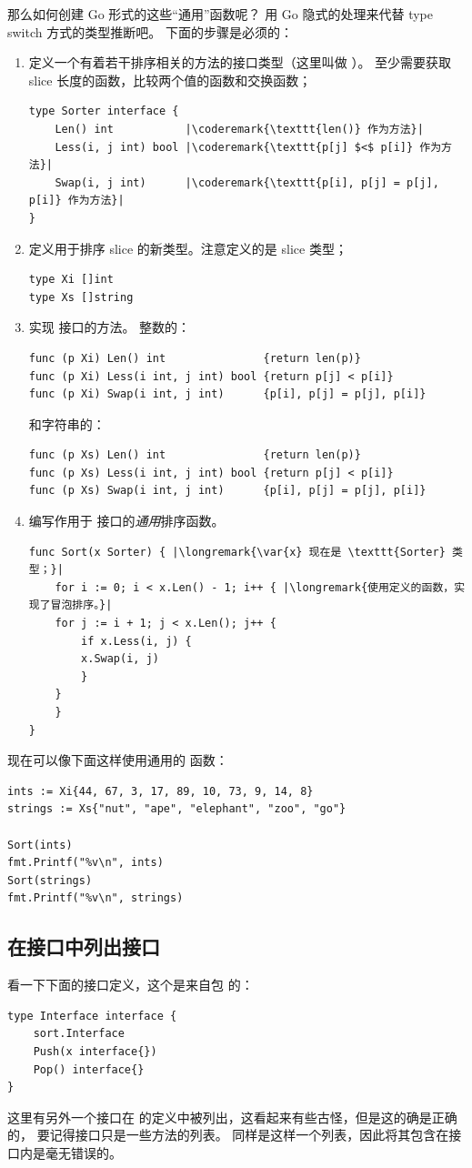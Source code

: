 那么如何创建 Go 形式的这些``通用''函数呢？
用 Go 隐式的处理来代替 type switch 方式的类型推断吧。
下面的步骤是必须的：
\begin{enumerate}
\item 定义一个有着若干排序相关的方法的接口类型（这里叫做 ）。
至少需要获取 slice 长度的函数，比较两个值的函数和交换函数；
\begin{lstlisting}
type Sorter interface {
    Len() int           |\coderemark{\texttt{len()} 作为方法}|
    Less(i, j int) bool |\coderemark{\texttt{p[j] $<$ p[i]} 作为方法}|
    Swap(i, j int)      |\coderemark{\texttt{p[i], p[j] = p[j], p[i]} 作为方法}|
}
\end{lstlisting}
\item 定义用于排序 slice 的新类型。注意定义的是 slice 类型；
\begin{lstlisting}
type Xi []int
type Xs []string
\end{lstlisting}
\item 实现  接口的方法。
整数的：
\begin{lstlisting}
func (p Xi) Len() int               {return len(p)}
func (p Xi) Less(i int, j int) bool {return p[j] < p[i]}
func (p Xi) Swap(i int, j int)      {p[i], p[j] = p[j], p[i]}
\end{lstlisting}
和字符串的：
\begin{lstlisting}
func (p Xs) Len() int               {return len(p)}
func (p Xs) Less(i int, j int) bool {return p[j] < p[i]}
func (p Xs) Swap(i int, j int)      {p[i], p[j] = p[j], p[i]}
\end{lstlisting}
\item 编写作用于  接口的\emph{通用}排序函数。
\begin{lstlisting}
func Sort(x Sorter) { |\longremark{\var{x} 现在是 \texttt{Sorter} 类型；}|
    for i := 0; i < x.Len() - 1; i++ { |\longremark{使用定义的函数，实现了冒泡排序。}|
	for j := i + 1; j < x.Len(); j++ {
	    if x.Less(i, j) {
		x.Swap(i, j)
	    }
	}
    }
}
\end{lstlisting}
\showremarks
\end{enumerate}
现在可以像下面这样使用通用的  函数：
\begin{lstlisting}
ints := Xi{44, 67, 3, 17, 89, 10, 73, 9, 14, 8}
strings := Xs{"nut", "ape", "elephant", "zoo", "go"}

Sort(ints)
fmt.Printf("%v\n", ints)
Sort(strings)
fmt.Printf("%v\n", strings)
\end{lstlisting}

\subsection{在接口中列出接口}
看一下下面的接口定义，这个是来自包  的：
\begin{lstlisting}
type Interface interface {
    sort.Interface
    Push(x interface{})
    Pop() interface{}
}
\end{lstlisting}
这里有另外一个接口在  的定义中被列出，这看起来有些古怪，但是这的确是正确的，%
要记得接口只是一些方法的列表。 同样是这样一个列表，因此将其包含在接口内是毫无错误的。

